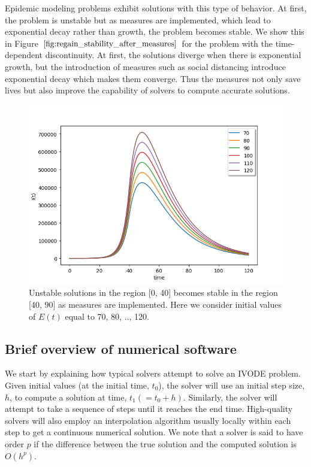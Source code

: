 Epidemic modeling problems exhibit solutions with this type of behavior. At first, the problem is unstable but as measures are implemented, which lead to exponential decay rather than growth, the problem becomes stable. We show this in Figure $\ref{fig:regain_stability_after_measures}$ for the problem with the time-dependent discontinuity. At first, the solutions diverge when there is exponential growth, but the introduction of measures such as social distancing introduce exponential decay which makes them converge. Thus the measures not only save lives but also improve the capability of solvers to compute accurate solutions.

\begin{figure}[H]
\centering
\includegraphics[width=0.7\linewidth]{./figures/regain_stability_after_measures}
\caption{Unstable solutions in the region [0, 40] becomes stable in the region [40, 90] as measures are implemented. Here we consider initial values of $E(t)$ equal to 70, 80, .., 120.}
\label{fig:regain_stability_after_measures}
\end{figure}

\subsection{Brief overview of numerical software}
We start by explaining how typical solvers attempt to solve an IVODE problem. Given initial values (at the initial time, $t_0$), the solver will use an initial step size, $h$, to compute a solution at time, $t_1 (= t_0 + h)$. Similarly, the solver will attempt to take a sequence of steps until it reaches the end time. High-quality solvers will also employ an interpolation algorithm usually locally within each step to get a continuous numerical solution. We note that a solver is said to have order $p$ if the difference between the true solution and the computed solution is $O(h^p)$.

